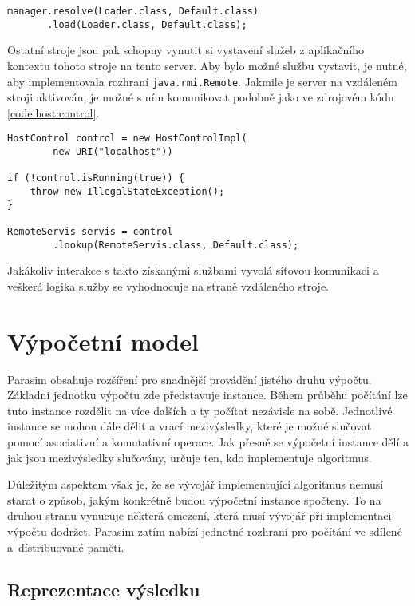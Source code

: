 \begin{lstlisting}[label={code:remote}, caption={Spuštění serveru}]
manager.resolve(Loader.class, Default.class)
	   .load(Loader.class, Default.class);
\end{lstlisting}
Ostatní stroje jsou pak schopny vynutit si vystavení služeb z aplikačního kontextu
tohoto stroje na tento server. Aby bylo možné službu vystavit, je nutné, aby implementovala
rozhraní \texttt{java.rmi.Remote}. Jakmile je server na vzdáleném stroji aktivován,
je možné s ním komunikovat podobně jako ve zdrojovém kódu \ref{code:host:control}.

\begin{lstlisting}[label={code:host:control}, caption={Přístup ke vzdálenému serveru}]
HostControl control = new HostControlImpl(
		new URI("localhost"))

if (!control.isRunning(true)) {
	throw new IllegalStateException();
}

RemoteServis servis = control
		.lookup(RemoteServis.class, Default.class);
\end{lstlisting}

Jakákoliv interakce s takto získanými službami vyvolá síťovou komunikaci a veškerá logika
služby se vyhodnocuje na straně vzdáleného stroje.

\section{Výpočetní model}

Parasim obsahuje rozšíření pro snadnější provádění jistého druhu vý\-poč\-tu.
Základní jednotku výpočtu zde představuje instance. Během průběhu po\-čí\-tá\-ní lze
tuto instance rozdělit na více dalších a ty počítat nezávisle na sobě. Jednotlivé instance
se mohou dále dělit a vrací mezivýsledky, které je možné slučovat pomocí asociativní
a komutativní operace. Jak přesně se výpočetní instance dělí a jak jsou mezivýsledky
slučovány, určuje ten, kdo implementuje algoritmus.

Důležitým aspektem však je, že se vývojář implementující algoritmus nemusí starat
o způsob, jakým konkrétně budou výpočetní instance spočteny. To na druhou stranu vynucuje
některá omezení, která musí vývojář při implementaci výpočtu dodržet.  Parasim zatím nabízí
jednotné rozhraní pro počítání ve sdílené a~dís\-tri\-buo\-va\-né paměti.

\subsection{Reprezentace výsledku}

